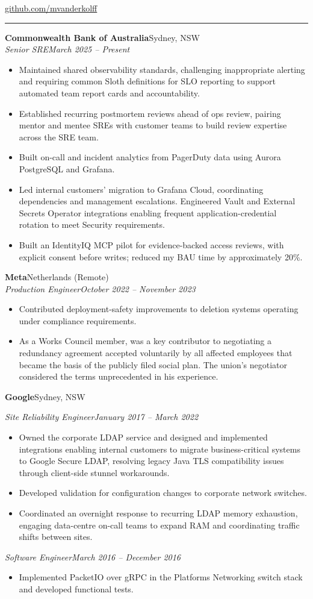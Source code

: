 \documentclass[a4paper,10pt]{article}
\newcommand{\role}[4]{\textbf{#1}\hfill #2\\\textit{#3}\hfill\textit{#4}\par}
\newcommand{\resumeItemListStart}{\begin{itemize}}
\newcommand{\resumeItemListEnd}{\end{itemize}\vspace{3pt}}
\newcommand{\resumeSubSubheading}[2]{\textit{#1}\hfill\textit{#2}\par}
\newcommand{\resheading}[1]{\par\vspace{5pt}{\scshape #1}\par\vspace{1pt}\hrule\vspace{4pt}}
\begin{document}
\vspace{-1em}
\href{https://github.com/mvanderkolff}{github.com/mvanderkolff}
\vspace{2pt}
\resheading{Experience}
\role{Commonwealth Bank of Australia}{Sydney, NSW}{Senior SRE}{March 2025 -- Present}
\resumeItemListStart
\item Maintained shared observability standards, challenging inappropriate alerting and requiring common Sloth definitions for SLO reporting to support automated team report cards and accountability.
\item Established recurring postmortem reviews ahead of ops review, pairing mentor and mentee SREs with customer teams to build review expertise across the SRE team.
\item Built on-call and incident analytics from PagerDuty data using Aurora PostgreSQL and Grafana.
\item Led internal customers' migration to Grafana Cloud, coordinating dependencies and management escalations. Engineered Vault and External Secrets Operator integrations enabling frequent application-credential rotation to meet Security requirements.
\item Built an IdentityIQ MCP pilot for evidence-backed access reviews, with explicit consent before writes; reduced my BAU time by approximately 20\%.
\resumeItemListEnd

\role{Meta}{Netherlands (Remote)}{Production Engineer}{October 2022 -- November 2023}
\resumeItemListStart
\item Contributed deployment-safety improvements to deletion systems operating under compliance requirements.
\item As a Works Council member, was a key contributor to negotiating a redundancy agreement accepted voluntarily by all affected employees that became the basis of the publicly filed social plan. The union's negotiator considered the terms unprecedented in his experience.
\resumeItemListEnd
\textbf{Google}\hfill Sydney, NSW\par
\resumeSubSubheading{Site Reliability Engineer}{January 2017 -- March 2022}
\resumeItemListStart
\item Owned the corporate LDAP service and designed and implemented integrations enabling internal customers to migrate business-critical systems to Google Secure LDAP, resolving legacy Java TLS compatibility issues through client-side stunnel workarounds.
\item Developed validation for configuration changes to corporate network switches.
\item Coordinated an overnight response to recurring LDAP memory exhaustion, engaging data-centre on-call teams to expand RAM and coordinating traffic shifts between sites.
\resumeItemListEnd
\resumeSubSubheading{Software Engineer}{March 2016 -- December 2016}
\resumeItemListStart
\item Implemented PacketIO over gRPC in the Platforms Networking switch stack and developed functional tests.
\resumeItemListEnd
\end{document}

